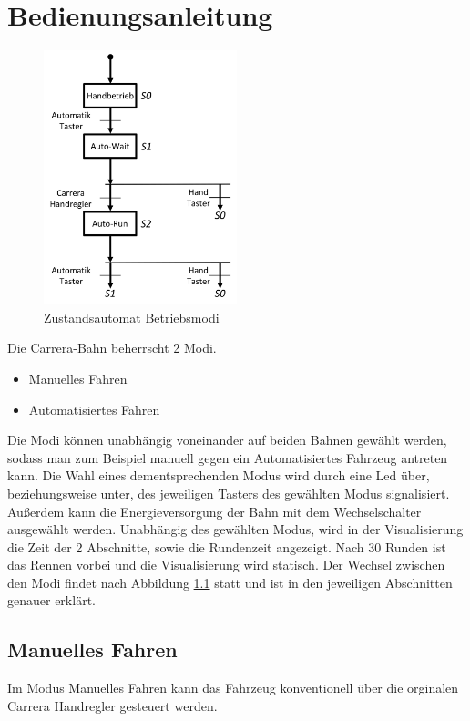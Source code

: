 \documentclass[a4paper, 11pt]{report}
\begin{document}

\chapter{Bedienungsanleitung}
	\begin{figure}[ht]
		\centering
		\includegraphics[width=0.5\textwidth]{rec/modiAuswahl.png}
		\caption{Zustandsautomat Betriebsmodi}
		\label{img:Betriebsmodi}
	\end{figure}
	Die Carrera-Bahn beherrscht 2 Modi.
	\begin{itemize}
		\item Manuelles Fahren
		\item Automatisiertes Fahren
	\end{itemize}
	Die Modi können unabhängig voneinander auf beiden Bahnen gewählt werden, sodass man zum Beispiel manuell gegen ein Automatisiertes Fahrzeug antreten kann. Die Wahl eines dementsprechenden Modus wird durch eine Led über, beziehungsweise unter, des jeweiligen Tasters des gewählten Modus signalisiert. Außerdem kann die Energieversorgung der Bahn mit dem Wechselschalter ausgewählt werden. Unabhängig des gewählten Modus, wird in der Visualisierung die Zeit der 2 Abschnitte, sowie die Rundenzeit angezeigt. Nach 30 Runden ist das Rennen vorbei und die Visualisierung wird statisch.
	Der Wechsel zwischen den Modi findet nach Abbildung \ref{img:Betriebsmodi} statt und ist in den jeweiligen Abschnitten genauer erklärt.
	\section{Manuelles Fahren}
		Im Modus Manuelles Fahren kann das Fahrzeug konventionell über die orginalen Carrera Handregler gesteuert
		werden.
\end{document}
